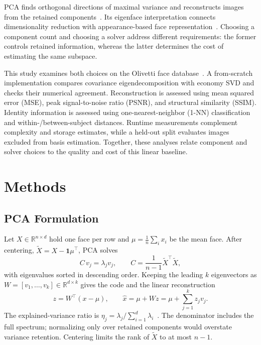 \documentclass[journal]{IEEEtran}
\begin{document}
PCA finds orthogonal directions of maximal variance and reconstructs images
from the retained components~\cite{jolliffe}. Its eigenface interpretation
connects dimensionality reduction with appearance-based face
representation~\cite{turk}. Choosing a component count and choosing a solver
address different requirements: the former controls retained information,
whereas the latter determines the cost of estimating the same subspace.

This study examines both choices on the Olivetti face
database~\cite{orl,sklearn}. A from-scratch implementation compares
covariance eigendecomposition with economy SVD and checks their numerical
agreement. Reconstruction is assessed using mean squared error (MSE), peak
signal-to-noise ratio (PSNR), and structural similarity (SSIM). Identity
information is assessed using one-nearest-neighbor (1-NN) classification
and within-/between-subject distances. Runtime measurements complement
complexity and storage estimates, while a held-out split evaluates images
excluded from basis estimation. Together, these analyses relate component
and solver choices to the quality and cost of this linear baseline.

\section{Methods}

\subsection{PCA Formulation}
Let $X\in\mathbb{R}^{n\times d}$ hold one face per row and
$\mu=\frac1n\sum_i x_i$ be the mean face. After centering,
$\tilde X = X-\mathbf{1}\mu^{\!\top}$, PCA solves
\begin{equation}
C\,v_j=\lambda_j v_j,\qquad
C=\frac{1}{n-1}\tilde X^{\!\top}\tilde X ,
\label{eq:eig}
\end{equation}
with eigenvalues sorted in descending order. Keeping the leading $k$
eigenvectors as $W=[v_1,\dots,v_k]\in\mathbb{R}^{d\times k}$ gives the code
and the linear reconstruction
\begin{equation}
z = W^{\!\top}(x-\mu),\qquad
\hat x = \mu + W z = \mu + \sum_{j=1}^{k} z_j v_j .
\label{eq:proj}
\end{equation}
The explained-variance ratio is
$\eta_j=\lambda_j/\sum_{i=1}^{d}\lambda_i$~\cite{abdi}.
The denominator includes the full spectrum; normalizing only over retained
components would overstate variance retention. Centering limits the rank
of $\tilde X$ to at most $n-1$.
\end{document}
